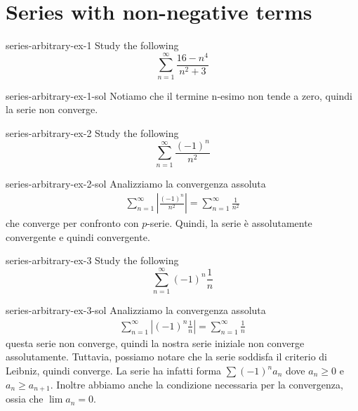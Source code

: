 \documentclass[preview]{standalone}
\begin{document}
\genpage

\section{Series with non-negative terms}

\begin{snippetexercise}{series-arbitrary-ex-1}{}
    Study the following \series
    \[
        \sum_{n=1}^\infty \frac{16-n^4}{n^2 + 3}
    \]
\end{snippetexercise}

\begin{snippetsolution}{series-arbitrary-ex-1-sol}{}
    Notiamo che il termine n-esimo non tende a zero, quindi la serie non converge.
\end{snippetsolution}

\begin{snippetexercise}{series-arbitrary-ex-2}{}
    Study the following \series
    \[
        \sum_{n=1}^\infty \frac{{(-1)}^n}{n^2}
    \]
\end{snippetexercise}

\begin{snippetsolution}{series-arbitrary-ex-2-sol}{}
    Analizziamo la convergenza assoluta
    \begin{align*}
        \sum_{n=1}^\infty \left|\frac{{(-1)}^n}{n^2}\right| = 
        \sum_{n=1}^\infty \frac{1}{n^2}
    \end{align*}
    che converge per confronto con \(p\)-serie.
    Quindi, la serie è assolutamente convergente e quindi convergente.
\end{snippetsolution}

\begin{snippetexercise}{series-arbitrary-ex-3}{}
    Study the following \series
    \[
        \sum_{n=1}^\infty {(-1)}^n \frac{1}{n}
    \]
\end{snippetexercise}

\begin{snippetsolution}{series-arbitrary-ex-3-sol}{}
    Analizziamo la convergenza assoluta
    \begin{align*}
        \sum_{n=1}^\infty \left| {(-1)}^n \frac{1}{n} \right|
        =
        \sum_{n=1}^\infty \frac{1}{n}
    \end{align*}
    questa serie non converge, quindi la nostra serie iniziale non converge assolutamente.
    Tuttavia, possiamo notare che la serie soddisfa il criterio di Leibniz, quindi converge.
    La serie ha infatti forma \(\sum {(-1)}^n a_n\) dove \(a_n \geq 0\)
    e \(a_n \geq a_{n+1}\). Inoltre abbiamo anche la condizione necessaria per la convergenza,
    ossia che \(\lim a_n = 0\).
\end{snippetsolution}
\end{document}
